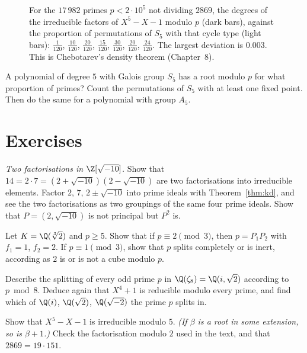 \begin{figure}[ht]
\centering
{}
\caption{For the $17\,982$ primes $p<2\cdot10^5$ not dividing $2869$, the degrees of the irreducible factors of
$X^5-X-1$ modulo $p$ (dark bars), against the proportion of permutations of $S_5$ with that cycle type (light bars):
$\frac1{120}$, $\frac{10}{120}$, $\frac{20}{120}$, $\frac{15}{120}$, $\frac{30}{120}$, $\frac{20}{120}$,
$\frac{24}{120}$. The largest deviation is $0.003$. This is Chebotarev's density theorem (Chapter~8).}
\label{fig:cycletypes}
\end{figure}

\begin{think}
A polynomial of degree $5$ with Galois group $S_5$ has a root modulo $p$ for what proportion of primes? Count the
permutations of $S_5$ with at least one fixed point. Then do the same for a polynomial with group $A_5$.
\end{think}

\section{Exercises}

\begin{exercise}[$\star$]\label{ex:sqrtm10}
\emph{Two factorisations in $\Z[\sqrt{-10}]$.} Show that $14=2\cdot7=(2+\sqrt{-10})(2-\sqrt{-10})$ are two
factorisations into irreducible elements. Factor $2$, $7$, $2\pm\sqrt{-10}$ into prime ideals with
Theorem~\ref{thm:kd}, and see the two factorisations as two groupings of the same four prime ideals. Show that
$P=(2,\sqrt{-10})$ is not principal but $P^2$ is.
\end{exercise}

\begin{exercise}[$\star$]\label{ex:cubic}
Let $K=\Q(\sqrt[3]2)$ and $p\ge5$. Show that if $p\equiv2\pmod 3$, then $p=P_1P_2$ with $f_1=1$, $f_2=2$. If
$p\equiv1\pmod3$, show that $p$ splits completely or is inert, according as $2$ is or is not a cube modulo $p$.
\end{exercise}

\begin{exercise}[$\star$]\label{ex:zeta8}
Describe the splitting of every odd prime $p$ in $\Q(\zeta_8)=\Q(i,\sqrt2)$ according to $p\bmod8$. Deduce again that
$X^4+1$ is reducible modulo every prime, and find which of $\Q(i)$, $\Q(\sqrt2)$, $\Q(\sqrt{-2})$ the prime $p$ splits
in.
\end{exercise}

\begin{exercise}[$\star\star$]\label{ex:s5}
Show that $X^5-X-1$ is irreducible modulo $5$. \emph{(If $\beta$ is a root in some extension, so is $\beta+1$.)}
Check the factorisation modulo $2$ used in the text, and that $2869=19\cdot151$.
\end{exercise}

